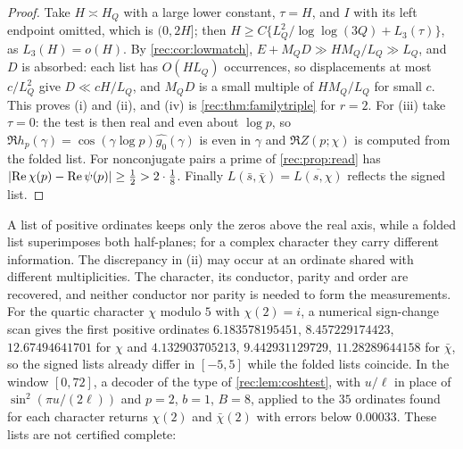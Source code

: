 \begin{proof}
Take $H\asymp H_Q$ with a large lower constant, $\tau=H$, and $I$ with its left endpoint omitted, which
is $(0,2H]$; then $H\ge C\{L_Q^2/\log\log(3Q)+L_3(\tau)\}$, as $L_3(H)=o(H)$. By \cref{rec:cor:lowmatch},
$E+M_QD\gg HM_Q/L_Q\gg L_Q$, and $D$ is absorbed: each list has $O(HL_Q)$ occurrences, so displacements
at most $c/L_Q^2$ give $D\ll cH/L_Q$, and $M_QD$ is a small multiple of $HM_Q/L_Q$ for small $c$. This proves
(i) and (ii), and (iv) is \cref{rec:thm:familytriple} for $r=2$. For (iii) take $\tau=0$: the test is then real and even
about $\log p$, so $\Re h_p(\gamma)=\cos(\gamma\log p)\widehat{g_0}(\gamma)$ is even in $\gamma$ and $\Re Z(p;\chi)$ is computed
from the folded list. For nonconjugate pairs a prime of \cref{rec:prop:read} has
$\lvert\operatorname{Re}\chi(p)-\operatorname{Re}\psi(p)\rvert\ge\tfrac12>2\cdot\tfrac18$. Finally $L(\bar s,\bar\chi)=\overline{L(s,\chi)}$ reflects the signed list.
\end{proof}

A list of positive ordinates keeps only the zeros above the real axis, while a folded list
superimposes both half-planes; for a complex character they carry different information. The
discrepancy in (ii) may occur at an ordinate shared with different multiplicities. The character,
its conductor, parity and order are recovered, and neither conductor nor parity is needed to form the
measurements. For the quartic character $\chi$ modulo $5$ with $\chi(2)=i$, a numerical sign-change scan
gives the first positive ordinates $6.183578195451$, $8.457229174423$, $12.67494641701$ for $\chi$ and
$4.132903705213$, $9.442931129729$, $11.28289644158$ for $\bar\chi$, so the signed lists already differ in
$[-5,5]$ while the folded lists coincide. In the window $[0,72]$, a decoder of the type of
\cref{rec:lem:coshtest}, with $u/\ell$ in place of $\sin^2(\pi u/(2\ell))$ and $p=2$, $b=1$, $B=8$, applied to the $35$ ordinates found for each character
returns $\chi(2)$ and $\bar\chi(2)$ with errors below $0.00033$. These lists are not certified complete:
\begin{center}
\\
\end{center}

